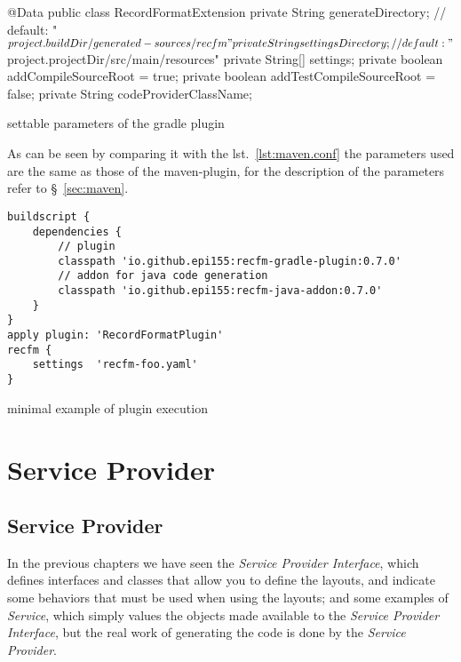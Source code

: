 \documentclass[a4paper,10pt]{report}
\newenvironment{elisting}[1][H]
  {\captionsetup{aboveskip=0pt}\begin{listing}[#1]}
  {\end{listing}%
}
\begin{document}
\begin{elisting}[!htb]
\begin{javacode}
@Data
public class RecordFormatExtension {
    private String generateDirectory; // default: "${project.buildDir}/generated-sources/recfm"
    private String settingsDirectory; // default: "${project.projectDir}/src/main/resources"
    private String[] settings;
    private boolean addCompileSourceRoot = true;
    private boolean addTestCompileSourceRoot = false;
    private String codeProviderClassName;
}
\end{javacode}
\caption{settable parameters of the gradle plugin}
\label{lst:gradle.conf}
\end{elisting}
As can be seen by comparing it with the lst.~\ref{lst:maven.conf} the parameters 
used are the same as those of the maven-plugin, for the description of the 
parameters refer to \S~\ref{sec:maven}.

\begin{elisting}[!htb]
\begin{verbatim}
buildscript {
    dependencies {
        // plugin
        classpath 'io.github.epi155:recfm-gradle-plugin:0.7.0'
        // addon for java code generation
        classpath 'io.github.epi155:recfm-java-addon:0.7.0'
    }
}
apply plugin: 'RecordFormatPlugin'
recfm {
    settings  'recfm-foo.yaml'
}
\end{verbatim}
\caption{minimal example of plugin execution}
\label{lst:grd-xmpl}
\end{elisting}


\part{Service Provider}\label{vol:sp}

\chapter{Service Provider}
In the previous chapters we have seen the \textsl{Service Provider Interface}, 
which defines interfaces and classes that allow you to define the layouts, and 
indicate some behaviors that must be used when using the layouts; 
and some examples of \textsl{Service}, which simply values the objects made 
available to the \textsl{Service Provider Interface}, but the real work of 
generating the code is done by the \textsl{Service Provider}.
\end{document}
